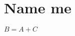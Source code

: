 \documentclass[12pt, a4paper, addpoints]{exam}
\begin{document}
\section{Name me} 
\begin{questions}
\Large
\question   
\setlength{\columnsep}{20pt}
\begin{multicols}{3}
\begin{parts}
\part 
\part 
\part
\end{parts}
\end{multicols}

\question   $B=A+C$ 
\setlength{\columnsep}{20pt}
\begin{multicols}{3}
\begin{parts}
\part 
\part 
\part
\end{parts}
\end{multicols}

\end{questions}
\end{document}
